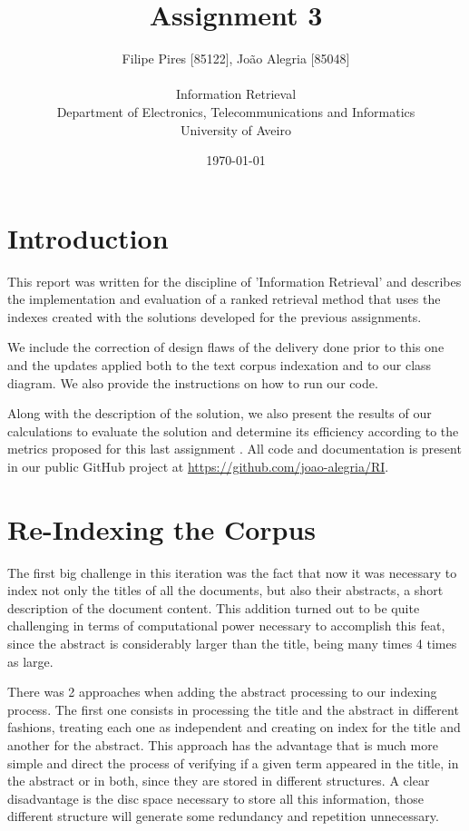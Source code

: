 \documentclass[12pt]{article}
\title{Assignment 3}
\author
{Filipe Pires [85122], João Alegria [85048]\\
\\
Information Retrieval\\
\normalsize{Department of Electronics, Telecommunications and Informatics}\\
\normalsize{University of Aveiro}\\
}
\date{\today{}}
\begin{document}
 
\baselineskip18pt
\maketitle 

\section{Introduction}

This report was written for the discipline of 'Information Retrieval' and 
describes the implementation and evaluation of a ranked retrieval method that 
uses the indexes created with the solutions developed for the previous assignments.

We include the correction of design flaws of the delivery done prior to this one
and the updates applied both to the text corpus indexation and to our class diagram.
We also provide the instructions on how to run our code.

Along with the description of the solution, we also present the results of our
calculations to evaluate the solution and determine its efficiency according to 
the metrics proposed for this last assignment \cite{assign3}.
All code and documentation is present in our public GitHub project at 
\url{https://github.com/joao-alegria/RI}. 

\newpage
\section{Re-Indexing the Corpus}
The first big challenge in this iteration was the fact that now it was necessary to index not only the titles of all the documents, but also their abstracts, a short description of the document content. This addition turned out to be quite challenging in terms of computational power necessary to accomplish this feat, since the abstract is considerably larger than the title, being many times 4 times as large.

There was 2 approaches when adding the abstract processing to our indexing process. The first one consists in processing the title and the abstract in different fashions, treating each one as independent and creating on index for the title and another for the abstract. This approach has the advantage that is much more simple and direct the process of verifying if a given term appeared in the title, in the abstract or in both, since they are stored in different structures. A clear disadvantage is the disc space necessary to store all this information, those different structure will generate some redundancy and repetition unnecessary.
\end{document}
